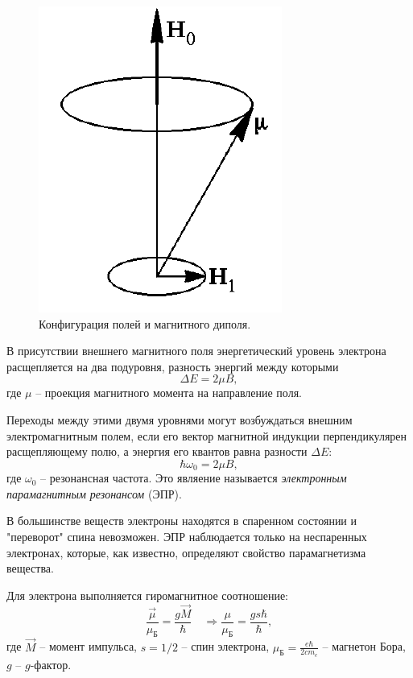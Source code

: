 \documentclass[a4paper, 12pt]{article} %
\begin{document}
	\begin{figure}
		\includegraphics[scale=0.6]{res/epr.png}
		\caption{Конфигурация полей и магнитного диполя.}
		\label{fig:epr_theory}
		\vspace{0pt}
	\end{figure}

	В присутствии внешнего магнитного поля энергетический уровень электрона расщепляется на два подуровня, разность энергий между которыми
	$$ \Delta E = 2 \mu B, $$
	где $\mu$ -- проекция магнитного момента на направление поля.

	Переходы между этими двумя уровнями могут возбуждаться внешним электромагнитным полем, если его вектор магнитной индукции перпендикулярен расщепляющему полю, а энергия его квантов равна разности $\Delta E$:
	\begin{equation}
		\hbar \omega_0 = 2 \mu B,
		\label{eq:frequency}
	\end{equation}
	где $\omega_0$ -- резонансная частота. Это являение называется \textit{электронным парамагнитным резонансом} (ЭПР).
	
	В большинстве веществ электроны находятся в спаренном состоянии и "переворот" спина невозможен. ЭПР наблюдается только на неспаренных электронах, которые, как известно, определяют свойство парамагнетизма вещества.
	
	Для электрона выполняется гиромагнитное соотношение:
	\begin{equation}
		\frac{\vec{\mu}}{\mu_{\text{Б}}} = \frac{g \vec{M}}{\hbar} \quad \Rightarrow \frac{\mu}{\mu_{\text{Б}}} = \frac{g s \hbar}{\hbar},
	\end{equation}
	где $\vec{M}$ -- момент импульса, $s = 1/2$ -- спин электрона, $\mu_{\text{Б}} = \frac{e \hbar}{2 c m_e}$ -- магнетон Бора, $g$ -- $g$-фактор.
	
\end{document}
